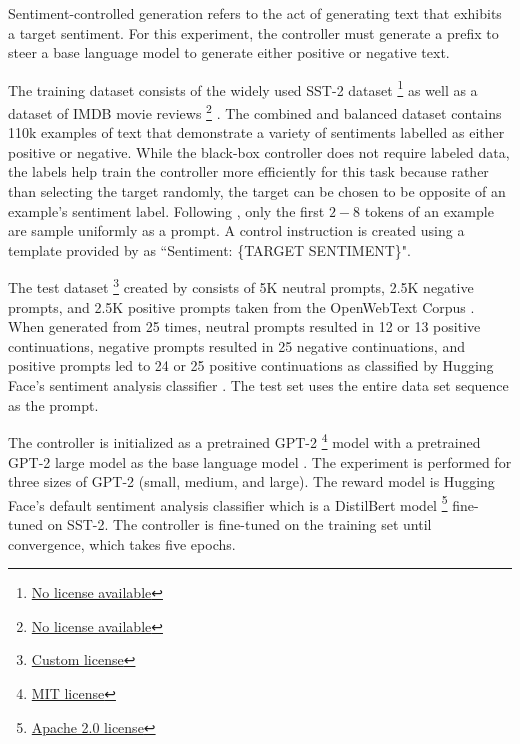 \documentclass[phd,electronic,oneside,twosidetoc,letterpaper,chaptercenter,parttop,lof]{byumsphd}
\begin{document}
Sentiment-controlled generation refers to the act of generating text that exhibits a target sentiment.
For this experiment, the controller must generate a prefix to steer a base language model to generate either positive or negative text.

The training dataset consists of the widely used SST-2 dataset \footnote{\href{https://huggingface.co/datasets/stanfordnlp/sst2}{No license available}} 
\cite{socher2013sst5} as well as a dataset of IMDB movie reviews \footnote{\href{https://huggingface.co/datasets/stanfordnlp/imdb}{No license available}} 
\cite{maas2011imdb}.
The combined and balanced dataset contains 110k examples of text that demonstrate a variety of sentiments labelled as either positive or negative.
While the black-box controller does not require labeled data, the labels help train the controller more efficiently for this task because rather than selecting the target randomly, the target can be chosen to be opposite of an example's sentiment label.
Following \cite{liu2021dexpert}, only the first $2-8$ tokens of an example are sample uniformly as a prompt. A control instruction is created using a template provided by \cite{zhang2023rmt} as \break ``Sentiment: \{TARGET SENTIMENT\}".

The test dataset \footnote{\href{https://skylion007.github.io/OpenWebTextCorpus/}{Custom license}} 
created by \cite{liu2021dexpert} consists of 5K neutral prompts, 2.5K negative prompts, and 2.5K positive prompts taken from the OpenWebText Corpus \cite{Gokaslan2019OpenWeb}. 
When generated from 25 times, neutral prompts resulted in 12 or 13 positive continuations, negative prompts resulted in 25 negative continuations, and positive prompts led to 24 or 25 positive continuations as classified by Hugging Face's sentiment analysis classifier \cite{wolf2020huggingface}.
The test set uses the entire data set sequence as the prompt.

The controller is initialized as a pretrained GPT-2 \footnote{\href{https://huggingface.co/openai-community/gpt2}{MIT license}} 
model with a pretrained GPT-2 large model as the base language model \cite{radford2019gpt2}.
The experiment is performed for three sizes of GPT-2 (small, medium, and large).
The reward model is Hugging Face's default sentiment analysis classifier which is a DistilBert model 
\footnote{\href{https://huggingface.co/distilbert/distilbert-base-uncased-finetuned-sst-2-english}{Apache 2.0 license}} 
\cite{sanh2019distilbert} fine-tuned on SST-2.
The controller is fine-tuned on the training set until convergence, which takes five epochs.
\end{document}
